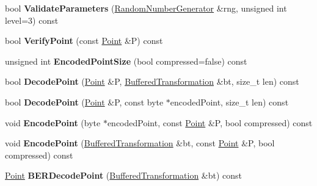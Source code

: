\begin{DoxyCompactItemize}
\item 
\hypertarget{class_e_c_p_a7d4efd7263293e409f736224393bb037}{
bool {\bfseries ValidateParameters} (\hyperlink{class_random_number_generator}{RandomNumberGenerator} \&rng, unsigned int level=3) const }
\label{class_e_c_p_a7d4efd7263293e409f736224393bb037}

\item 
\hypertarget{class_e_c_p_a5f7163f70d5bbc22394948019b84046f}{
bool {\bfseries VerifyPoint} (const \hyperlink{struct_e_c_p_point}{Point} \&P) const }
\label{class_e_c_p_a5f7163f70d5bbc22394948019b84046f}

\item 
\hypertarget{class_e_c_p_a4273ed51110725435ddeefcac166c29d}{
unsigned int {\bfseries EncodedPointSize} (bool compressed=false) const }
\label{class_e_c_p_a4273ed51110725435ddeefcac166c29d}

\item 
\hypertarget{class_e_c_p_af76cfd310eb62de1eca144cb3a8564e1}{
bool {\bfseries DecodePoint} (\hyperlink{struct_e_c_p_point}{Point} \&P, \hyperlink{class_buffered_transformation}{BufferedTransformation} \&bt, size\_\-t len) const }
\label{class_e_c_p_af76cfd310eb62de1eca144cb3a8564e1}

\item 
\hypertarget{class_e_c_p_ac650cc966abf53f8bdd961a227e1bab9}{
bool {\bfseries DecodePoint} (\hyperlink{struct_e_c_p_point}{Point} \&P, const byte $\ast$encodedPoint, size\_\-t len) const }
\label{class_e_c_p_ac650cc966abf53f8bdd961a227e1bab9}

\item 
\hypertarget{class_e_c_p_a48d48d6d0925e464f019173c96c81599}{
void {\bfseries EncodePoint} (byte $\ast$encodedPoint, const \hyperlink{struct_e_c_p_point}{Point} \&P, bool compressed) const }
\label{class_e_c_p_a48d48d6d0925e464f019173c96c81599}

\item 
\hypertarget{class_e_c_p_aad826193a57fe5b7e5cd2c9f6e6347fc}{
void {\bfseries EncodePoint} (\hyperlink{class_buffered_transformation}{BufferedTransformation} \&bt, const \hyperlink{struct_e_c_p_point}{Point} \&P, bool compressed) const }
\label{class_e_c_p_aad826193a57fe5b7e5cd2c9f6e6347fc}

\item 
\hypertarget{class_e_c_p_aee1197672609ce2b1faba9107f4cc34d}{
\hyperlink{struct_e_c_p_point}{Point} {\bfseries BERDecodePoint} (\hyperlink{class_buffered_transformation}{BufferedTransformation} \&bt) const }
\label{class_e_c_p_aee1197672609ce2b1faba9107f4cc34d}


\end{DoxyCompactItemize}
